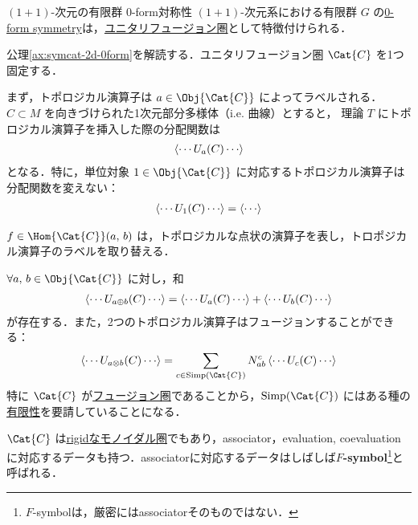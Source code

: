 \documentclass[TQFT_main]{subfiles}
\begin{document}
\begin{myaxiom}[label=ax:symcat-2d-0form]{$(1+1)$-次元の有限群 $0$-form対称性}
    $(1+1)$-次元系における有限群 $G$ の\hyperref[def:p-form-sym]{0-form symmetry}は，\hyperref[def:tensorfusion-cat]{ユニタリフュージョン圏}として特徴付けられる．
\end{myaxiom}

公理\ref{ax:symcat-2d-0form}を解読する．ユニタリフュージョン圏 $\Cat{C}$ を1つ固定する．

まず，トポロジカル演算子は $a \in \Obj{\Cat{C}}$ によってラベルされる．$C \subset M$ を向きづけられた1次元部分多様体（i.e. 曲線）とすると，
理論 $T$ にトポロジカル演算子を挿入した際の分配関数は
\begin{align}
    \expval{\cdots U_a (C) \cdots}
\end{align}
となる．特に，単位対象 $1 \in \Obj{\Cat{C}}$ に対応するトポロジカル演算子は分配関数を変えない：
\begin{align}
    \expval{\cdots U_1 (C) \cdots} = \expval{\cdots}
\end{align}

$f \in \Hom{\Cat{C}}(a,\, b)$ は，トポロジカルな点状の演算子を表し，トロポジカル演算子のラベルを取り替える．
\begin{center}
\end{center}

$\forall a,\, b \in \Obj{\Cat{C}}$ に対し，和
\begin{align}
    \expval{\cdots U_{a \oplus b} (C) \cdots} = \expval{\cdots U_a (C) \cdots} + \expval{\cdots U_b(C) \cdots}
\end{align}
が存在する．また，2つのトポロジカル演算子はフュージョンすることができる：
\begin{align}
    \expval{\cdots U_{a \otimes b} (C) \cdots} = \sum_{c \in \mathrm{Simp}(\Cat{C})} N^c_{ab} \expval{\cdots U_c (C) \cdots}
\end{align}
特に $\Cat{C}$ が\hyperref[def:tensorfusion-cat]{フュージョン圏}であることから，$\mathrm{Simp}(\Cat{C})$ にはある種の\hyperref[def:finite-abcat]{有限性}を要請していることになる．

$\Cat{C}$ は\hyperref[redef:rigid]{rigidなモノイダル圏}でもあり，associator，evaluation, coevaluationに対応するデータも持つ．associatorに対応するデータはしばしば\textbf{$F$-symbol}\footnote{$F$-symbolは，厳密にはassociatorそのものではない．}と呼ばれる．
\end{document}

